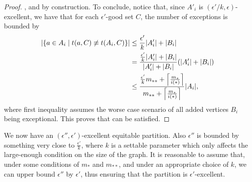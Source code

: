 \begin{lemma}
\begin{proof}
                ,
                 and
                 by construction.
                To conclude, notice that, since $A'_i$ is $(\epsilon'/k, \epsilon)$-excellent, we have that
                for each $\epsilon'$-good set $C$, the number of exceptions is bounded by
                \begin{align}
                    | \{ a \in A_i \mid t(a, C) \not\equiv t(A_i, C) \} |
                        & \leq \frac{\epsilon'}{k} | A_i' | + | B_i | \nonumber \\
                        & = \frac{\frac{\epsilon'}{k} | A_i' | + | B_i |}{| A_i' | + | B_i |}
                            ( | A_i' | + | B_i | ) \label{eq:paso_atras} \\
                        & \leq \frac{\frac{\epsilon'}{k} m_{**} + \left\lceil \frac{m_*}{i(*)} \right\rceil}{m_{**} + \left\lceil \frac{m_*}{i(*)} \right\rceil}
                            | A_i |, \nonumber
                \end{align}
                where first inequality assumes the worse case scenario of all added vertices $B_i$ being exceptional.
                This proves that  can be satisfied.
            \end{proof}
        \end{lemma}

        We now have an $(\epsilon'', \epsilon')$-excellent equitable partition.
        Also $\epsilon''$ is bounded by something very close to $\frac{\epsilon'}{k}$, where $k$ is a settable parameter
        which only affects the large-enough condition on the size of the graph.
        It is reasonable to assume that, under some conditions of $m_*$ and $m_{**}$, and under an appropriate choice of $k$,
        we can upper bound $\epsilon''$ by $\epsilon'$, thus ensuring that the partition is $\epsilon'$-excellent.

